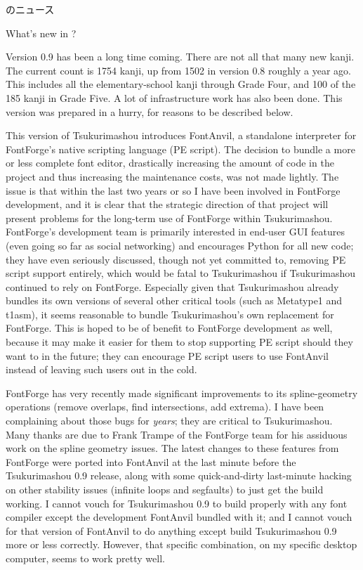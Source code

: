 \documentclass[14pt]{extarticle}
\newcommand{\blsubsection}[2]{%
\kaku\large#1\qquad\phantomsection%
\addcontentsline{toc}{subsection}{#1 #2}%
#2\par\addpenalty{-300}\normalsize}
\begin{document}

\blsubsection{\TsukurimashouVWide
のニュース}{What's new in \TsukurimashouVersion?}

Version 0.9 has been a long time coming.  There are not all that many new
kanji.  The current count is 1754 kanji, up from 1502 in version 0.8 roughly
a year ago.  This includes all the elementary-school kanji through Grade
Four, and 100 of the 185 kanji in Grade Five.  A lot of infrastructure work
has also been done.  This version was prepared in a hurry, for reasons to be
described below.

This version of Tsukurimashou introduces FontAnvil, a standalone interpreter
for FontForge's native scripting language (PE script).  The decision to
bundle a more or less complete font editor, drastically increasing the
amount of code in the project and thus increasing the maintenance costs, was
not made lightly.  The issue is that within the last two years or so I have
been involved in FontForge development, and it is clear that the strategic
direction of that project will present problems for the long-term use of
FontForge within Tsukurimashou.  FontForge's development team is primarily
interested in end-user GUI features (even going so far as social networking)
and encourages Python for all new code; they have even seriously discussed,
though not yet committed to, removing PE script support entirely, which
would be fatal to Tsukurimashou if Tsukurimashou continued to rely on
FontForge.  Especially given that Tsukurimashou already bundles its own
versions of several other critical tools (such as Metatype1 and t1asm), it
seems reasonable to bundle Tsukurimashou's own replacement for FontForge. 
This is hoped to be of benefit to FontForge development as well, because it
may make it easier for them to stop supporting PE script should they want to
in the future; they can encourage PE script users to use FontAnvil instead
of leaving such users out in the cold.

FontForge has very recently made significant improvements to its
spline-geometry operations (remove overlaps, find intersections, add
extrema).  I have been complaining about those bugs for \emph{years}; they
are critical to Tsukurimashou.  Many thanks are due to Frank Trampe of the
FontForge team for his assiduous work on the spline geometry issues.  The
latest changes to these features from FontForge were ported into FontAnvil
at the last minute before the Tsukurimashou 0.9 release, along with some
quick-and-dirty last-minute hacking on other stability issues (infinite
loops and segfaults) to just get the build working.  I cannot vouch for
Tsukurimashou 0.9 to build properly with any font compiler except the
development FontAnvil bundled with it; and I cannot vouch for that version
of FontAnvil to do anything except build Tsukurimashou 0.9 more or less
correctly.  However, that specific combination, on my specific desktop
computer, seems to work pretty well.
\end{document}

